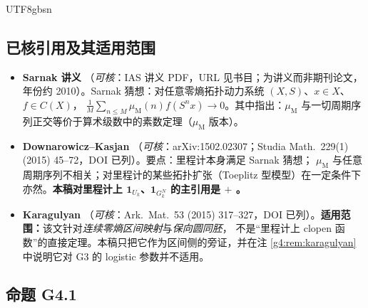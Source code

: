 \documentclass[11pt,a4paper]{article}
\newcommand{\Mob}{\mu_{\mathrm{M}}}    %
\theoremstyle{plain}
\theoremstyle{definition}
\begin{document}
\begin{CJK}{UTF8}{gbsn}
\subsection{已核引用及其适用范围}
\begin{itemize}[leftmargin=*]
\item \textbf{Sarnak 讲义} \cite{Sar10}（\emph{可核}：IAS 讲义 PDF，URL 见书目；为讲义而非期刊论文，年份约 2010）。Sarnak 猜想：对任意零熵拓扑动力系统 $(X,S)$、$x\in X$、$f\in C(X)$，
$\frac1M\sum_{n\le M}\Mob(n)f(S^nx)\to0$。其中指出：$\Mob$ 与一切周期序列正交等价于算术级数中的素数定理（$\Mob$ 版本）。
\item \textbf{Downarowicz--Kasjan} \cite{DK15}（\emph{可核}：arXiv:1502.02307；Studia Math.\ 229(1) (2015) 45--72，DOI 已列）。要点：里程计本身满足 Sarnak 猜想；
$\Mob$ 与任意周期序列不相关；对里程计的某些拓扑扩张（Toeplitz 型模型）在一定条件下亦然。\textbf{本稿对里程计上 $\mathbf 1_{U_k}$、$\mathbf 1_{G_k^N}$ 的主引用是 \cite{DK15} $+$ \cite{Sar10}。}
\item \textbf{Karagulyan} \cite{Kar15}（\emph{可核}：Ark.\ Mat.\ 53 (2015) 317--327，DOI 已列）。\textbf{适用范围：}该文针对\emph{连续零熵区间映射}与\emph{保向圆同胚}，
不是“里程计上 clopen 函数”的直接定理。本稿只把它作为区间侧的旁证，并在注 \ref{g4:rem:karagulyan} 中说明它对 G3 的 logistic 参数并不适用。
\end{itemize}

\subsection{命题 G4.1}


\end{CJK}
\end{document}
